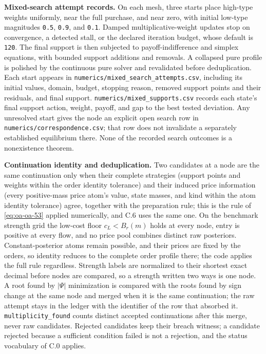 \documentclass[
  11pt,
]{article}
\newcounter{none} %
\begin{document}
\textbf{Mixed-search attempt records.} On each mesh, three starts place
high-type weights uniformly, near the full purchase, and near zero, with
initial low-type magnitudes \texttt{0.5}, \texttt{0.9}, and
\texttt{0.1}. Damped multiplicative-weight updates stop on convergence,
a detected stall, or the declared iteration budget, whose default is
\texttt{120}. The final support is then subjected to payoff-indifference
and simplex equations, with bounded support additions and removals. A
collapsed pure profile is polished by the continuous pure solver and
revalidated before deduplication. Each start appears in
\texttt{numerics/mixed\_search\_attempts.csv}, including its initial
values, domain, budget, stopping reason, removed support points and
their residuals, and final support.
\texttt{numerics/mixed\_supports.csv} records each state's final support
action, weight, payoff, and gap to the best tested deviation. Any
unresolved start gives the node an explicit open search row in
\texttt{numerics/correspondence.csv}; that row does not invalidate a
separately established equilibrium there. None of the recorded search
outcomes is a nonexistence theorem.

\textbf{Continuation identity and deduplication.} Two candidates at a
node are the same continuation only when their complete strategies
(support points and weights within the order identity tolerance) and
their induced price information (every positive-mass price atom's value,
state masses, and kind within the atom identity tolerance) agree,
together with the preparation rule; this is the rule of
\eqref{eq:oa-oa-53} applied numerically, and C.6 uses the same one. On
the benchmark strength grid the low-cost floor \(c_L<B_r(m)\) holds at
every node, entry is positive at every flow, and no price pool combines
distinct raw posteriors. Constant-posterior atoms remain possible, and
their prices are fixed by the orders, so identity reduces to the
complete order profile there; the code applies the full rule regardless.
Strength labels are normalized to their shortest exact decimal before
nodes are compared, so a strength written two ways is one node. A root
found by \(|\Psi|\) minimization is compared with the roots found by
sign change at the same node and merged when it is the same
continuation; the raw attempt stays in the ledger with the identifier of
the row that absorbed it. \texttt{multiplicity\_found} counts distinct
accepted continuations after this merge, never raw candidates. Rejected
candidates keep their breach witness; a candidate rejected because a
sufficient condition failed is not a rejection, and the status
vocabulary of C.0 applies.
\end{document}

